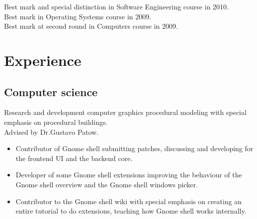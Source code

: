 {
    Best mark and special distinction in Software Engineering course in 2010. \\
    Best mark in Operating Systems course in 2009. \\
    Best mark at second round in Computers course in 2009. \\
}



\section{Experience}

\subsection{Computer science}

{
    Research and development computer graphics procedural modeling with special emphasis on procedural
    buildings. \\
    Advised by Dr.Gustavo Patow.
}


{
    \begin{itemize}
      \item Contributor of Gnome shell submitting patches, discussing and developing for the frontend UI and the backend core.
      \item Developer of some Gnome shell extensions improving the behaviour of the Gnome shell overview and the Gnome shell windows picker.
      \item Contributor to the Gnome shell wiki with special emphasis on creating an entire tutorial to do extensions, teaching how Gnome shell works internally.
    \end{itemize}
}


